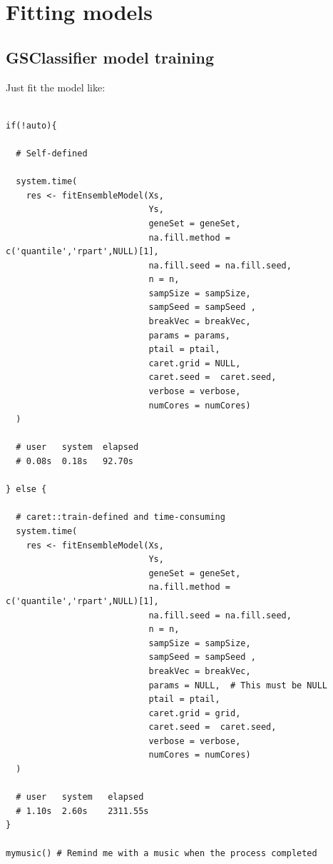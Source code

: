 \documentclass[
  12pt,
]{book}
\begin{document}
\hypertarget{fitting-models}{%
\section{Fitting models}\label{fitting-models}}

\hypertarget{gsclassifier-model-training}{%
\subsection{GSClassifier model training}\label{gsclassifier-model-training}}

Just fit the model like:

\begin{verbatim}

if(!auto){
  
  # Self-defined
  
  system.time(
    res <- fitEnsembleModel(Xs,
                            Ys,
                            geneSet = geneSet,
                            na.fill.method = c('quantile','rpart',NULL)[1],
                            na.fill.seed = na.fill.seed,
                            n = n,
                            sampSize = sampSize,
                            sampSeed = sampSeed ,
                            breakVec = breakVec,
                            params = params,
                            ptail = ptail,
                            caret.grid = NULL,
                            caret.seed =  caret.seed,
                            verbose = verbose,
                            numCores = numCores)
  )
  
  # user   system  elapsed
  # 0.08s  0.18s   92.70s
  
} else {
  
  # caret::train-defined and time-consuming
  system.time(
    res <- fitEnsembleModel(Xs,
                            Ys,
                            geneSet = geneSet,
                            na.fill.method = c('quantile','rpart',NULL)[1],
                            na.fill.seed = na.fill.seed,
                            n = n,
                            sampSize = sampSize,
                            sampSeed = sampSeed ,
                            breakVec = breakVec,
                            params = NULL,  # This must be NULL
                            ptail = ptail,
                            caret.grid = grid,
                            caret.seed =  caret.seed,
                            verbose = verbose,
                            numCores = numCores)
  )
  
  # user   system   elapsed
  # 1.10s  2.60s    2311.55s
}

mymusic() # Remind me with a music when the process completed
\end{verbatim}
\end{document}
